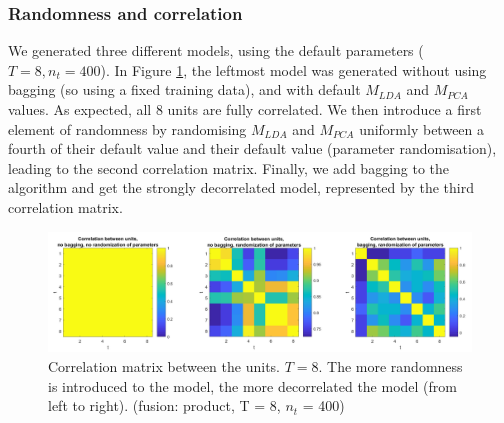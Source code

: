 \documentclass[10pt,technote]{IEEEtran}
\begin{document}
\subsubsection{Randomness and correlation}
We generated three different models, using the default parameters ($T = 8, n_t = 400$). In Figure \ref{fig:corrs}, the leftmost model was generated without using bagging (so using a fixed training data), and with default $M_{LDA}$ and $M_{PCA}$ values. As expected, all 8 units are fully correlated. We then introduce a first element of randomness by randomising $M_{LDA}$ and $M_{PCA}$ uniformly between a fourth of their default value and their default value (parameter randomisation), leading to the second correlation matrix. Finally, we add bagging to the algorithm and get the strongly decorrelated model, represented by the third correlation matrix.  

\begin{figure}[htb!]
    \centering
    \includegraphics[width=\linewidth]{../results/ex2LDAEnsemble/correlation.png}
    \caption{Correlation matrix between the units. $T = 8$. The more randomness is introduced to the model, the more decorrelated the model (from left to right). (fusion: product, T = 8, $n_t$ = 400)}
    \label{fig:corrs}
\end{figure}
\end{document}
